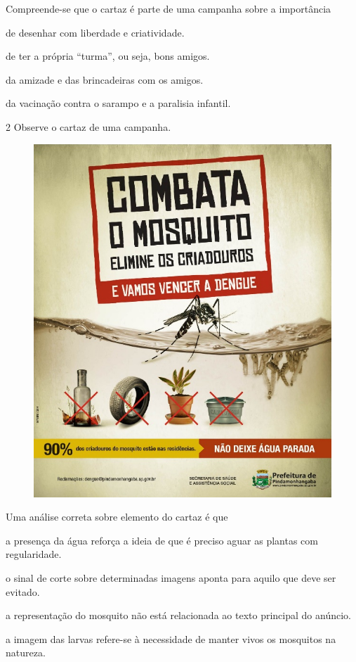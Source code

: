 
Compreende-se que o cartaz é parte de uma campanha sobre a importância

\begin{escolha}[itemsep=-5pt]
\item de desenhar com liberdade e criatividade.

\item de ter a própria ``turma'', ou seja, bons amigos.

\item da amizade e das brincadeiras com os amigos.

\item da vacinação contra o sarampo e a paralisia infantil.
\end{escolha}

\num{2} Observe o cartaz de uma campanha.


\begin{figure}[htpb!]
\centering
\includegraphics[width=.7\textwidth]{./media/image13.jpeg}
\end{figure}

Uma análise correta sobre elemento do cartaz é que

\begin{escolha}[itemsep=-5pt]
\item a presença da água reforça a ideia de que é preciso aguar as plantas com regularidade.

\item o sinal de corte sobre determinadas imagens aponta para aquilo que deve ser evitado.

\item a representação do mosquito não está relacionada ao texto principal do anúncio.

\item a imagem das larvas refere-se à necessidade de manter vivos os mosquitos na natureza.
\end{escolha}

